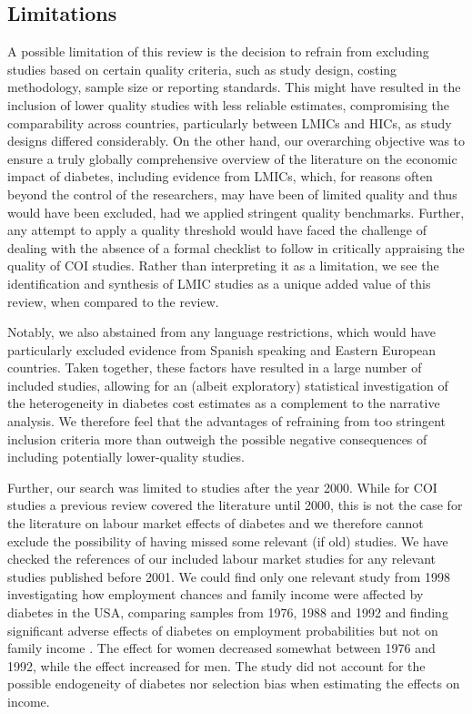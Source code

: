 \subsection{Limitations}
A possible limitation of this review is the decision to refrain from excluding studies based on certain quality criteria, such as study design, costing methodology, sample size or reporting standards. This might have resulted in the inclusion of lower quality studies with less reliable estimates, compromising the comparability across countries, particularly between \acp{LMIC} and \acp{HIC}, as study designs differed considerably. On the other hand, our overarching objective was to ensure a truly globally comprehensive overview of the literature on the economic impact of diabetes, including evidence from \acp{LMIC}, which, for reasons often beyond the control of the researchers, may have been of limited quality and thus would have been excluded, had we applied stringent quality benchmarks. Further, any attempt to apply a quality threshold would have faced the challenge of dealing with the absence of a formal checklist to follow in critically appraising the quality of \ac{COI} studies. Rather than interpreting it as a limitation, we see the identification and synthesis of \ac{LMIC} studies as a unique added value of this review, when compared to the \textcite{Ettaro2004} review. 

Notably, we also abstained from any language restrictions, which would have particularly excluded evidence from Spanish speaking and Eastern European countries. Taken together, these factors have resulted in a large number of included studies, allowing for an (albeit exploratory) statistical investigation of the heterogeneity in diabetes cost estimates as a complement to the narrative analysis. We therefore feel that the advantages of refraining from too stringent inclusion criteria more than outweigh the possible negative consequences of including potentially lower-quality studies.

Further, our search was limited to studies after the year 2000. While for \ac{COI} studies a previous review covered the literature until 2000, this is not the case for the literature on labour market effects of diabetes and we therefore cannot exclude the possibility of having missed some relevant (if old) studies. We have checked the references of our included labour market
studies for any relevant studies published before 2001. We could find only one relevant study from 1998 investigating how employment
chances and family income were affected by diabetes in the USA, comparing samples from 1976, 1988 and 1992 and finding significant
adverse effects of diabetes on employment probabilities but not on family income \parencite{Kahn1998b}. The effect for women decreased somewhat between 1976 and 1992, while the effect increased for men. The study did not account for the possible endogeneity of diabetes nor selection bias when estimating the effects on income.

